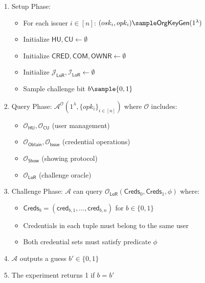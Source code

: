 \begin{enumerate}
    \item Setup Phase:
    \begin{itemize}
        \item For each issuer $i \in [n]$: $(osk_i, opk_i) \sample \mathsf{OrgKeyGen}(1^\lambda)$
        \item Initialize $\mathsf{HU, CU} \gets \emptyset$
        \item Initialize $\mathsf{CRED, COM, OWNR} \gets \emptyset$
        \item Initialize $\mathcal{J}_{\mathsf{LoR}}, \mathcal{I}_{\mathsf{LoR}} \gets \emptyset$
        \item Sample challenge bit $b \sample \{0,1\}$
    \end{itemize}

    \item Query Phase: $\mathcal{A}^{\mathcal{O}}(1^\lambda, \{opk_i\}_{i \in [n]})$ where $\mathcal{O}$ includes:
    \begin{itemize}
        \item $\mathcal{O}_{\mathsf{HU}}, \mathcal{O}_{\mathsf{CU}}$ (user management)
        \item $\mathcal{O}_{\mathsf{Obtain}}, \mathcal{O}_{\mathsf{Issue}}$ (credential operations)
        \item $\mathcal{O}_{\mathsf{Show}}$ (showing protocol)
        \item $\mathcal{O}_{\mathsf{LoR}}$ (challenge oracle)
    \end{itemize}

    \item Challenge Phase: 
    $\mathcal{A}$ can query $\mathcal{O}_{\mathsf{LoR}}(\mathsf{Creds}_0, \mathsf{Creds}_1, \phi)$ where:
    \begin{itemize}
        \item $\mathsf{Creds}_b = (\mathsf{cred}_{b,1},...,\mathsf{cred}_{b,n})$ for $b \in \{0,1\}$
        \item Credentials in each tuple must belong to the same user
        \item Both credential sets must satisfy predicate $\phi$
    \end{itemize}

    \item $\mathcal{A}$ outputs a guess $b' \in \{0,1\}$

    \item The experiment returns 1 if $b = b'$
\end{enumerate}




